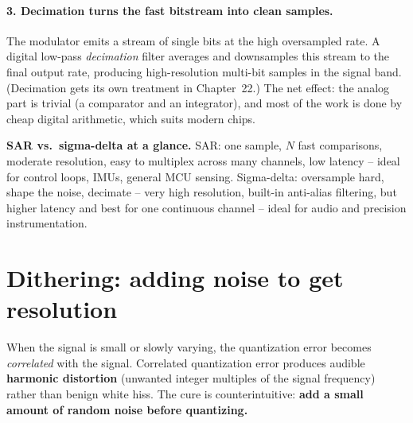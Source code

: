 \paragraph{3. Decimation turns the fast bitstream into clean samples.} The modulator emits a
stream of single bits at the high oversampled rate. A digital low-pass \emph{decimation} filter
averages and downsamples this stream to the final output rate, producing high-resolution
multi-bit samples in the signal band. (Decimation gets its own treatment in Chapter~22.) The net
effect: the analog part is trivial (a comparator and an integrator), and most of the work is
done by cheap digital arithmetic, which suits modern chips.

\begin{focusbox}
\textbf{SAR vs.\ sigma-delta at a glance.} SAR: one sample, $N$ fast comparisons, moderate
resolution, easy to multiplex across many channels, low latency -- ideal for control loops, IMUs,
general MCU sensing. Sigma-delta: oversample hard, shape the noise, decimate -- very high
resolution, built-in anti-alias filtering, but higher latency and best for one continuous
channel -- ideal for audio and precision instrumentation.
\end{focusbox}

\section{Dithering: adding noise to get resolution}
\label{ch19:dither}

When the signal is small or slowly varying, the quantization error becomes \emph{correlated} with the signal. Correlated quantization error produces audible \textbf{harmonic distortion} (unwanted integer multiples of the signal frequency) rather than benign white hiss. The cure is counterintuitive: \textbf{add a small amount of random noise before quantizing.}

